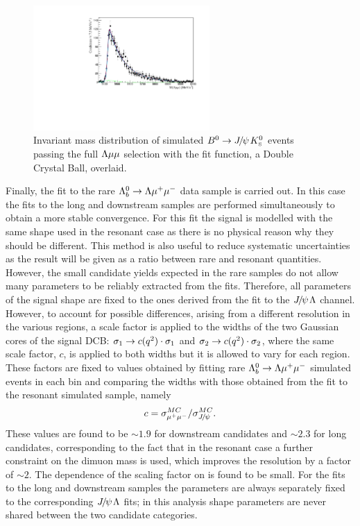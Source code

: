 \begin{figure}
\centering
\includegraphics[width=0.6\textwidth]{Lmumu/figs/MassFits/fitKS_bkg.pdf}
\caption{Invariant mass distribution of simulated $\Bz\ra\jpsi\KS$ events passing the
full $\Lambda\mu\mu$ selection with the fit function, a Double Crystal Ball, overlaid. }
\label{fig:KSbkgFit}
\end{figure}

Finally, the fit to the rare $\Lambda^0_b\rightarrow\Lambda\mu^+\mu^-$ data sample is carried out. In this case the fits to the long
and downstream samples are performed simultaneously to obtain a more stable convergence. 
For this fit the signal is modelled with the same shape used in the resonant case as there is no physical
reason why they should be different. This method is also useful to reduce systematic uncertainties
as the result will be given as a ratio between rare and resonant quantities.
However, the small candidate yields expected in the rare samples do not allow many 
parameters to be reliably extracted from the fits.
Therefore, all parameters of the signal shape are fixed to
the ones derived from the fit to the $\jpsi\Lz$ channel. However, to account for possible differences, 
arising from a different resolution in the various \qsq regions, a scale factor is applied
to the widths of the two Gaussian cores of the signal DCB: $\sigma_1 \rightarrow c(q^2)\cdot \sigma_1$
and $\sigma_2 \rightarrow c(q^2)\cdot \sigma_2$, where the same scale factor, $c$, is applied to both widths
but it is allowed to vary for each \qsq region. 
These factors are fixed to values obtained by fitting rare $\Lambda^0_b\rightarrow\Lambda\mu^+\mu^-$ simulated events in each \qsq bin and comparing
the widths with those obtained from the fit to the resonant simulated sample, namely
\begin{equation}
c = \sigma_{\mumu}^{MC} / \sigma_{\jpsi}^{MC}.
\end{equation}
These values are found to be $\sim 1.9$ for downstream candidates and $\sim 2.3$ for long candidates,
corresponding to the fact that in the resonant case a further constraint on the dimuon mass
is used, which improves the resolution by a factor of $\sim2$. The dependence of the scaling factor on \qsq 
is found to be small. For the fits to the long and downstream samples the parameters are always separately fixed to the
corresponding $\jpsi\Lz$ fits; in this analysis shape parameters are never shared between the two candidate categories.

